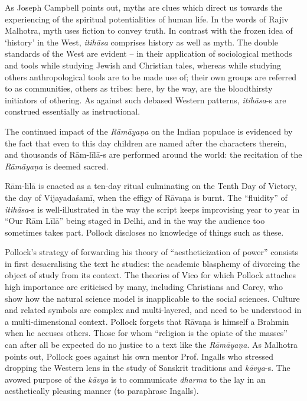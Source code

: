 As Joseph Campbell points out, myths are clues which direct us towards the experiencing of the spiritual potentialities of human life. In the words of Rajiv Malhotra, myth uses fiction to convey truth. In contrast with the frozen idea of ‘history’ in the West, \textit{itihāsa} comprises history as well as myth. The double standards of the West are evident – in their application of sociological methods and tools while studying Jewish and Christian tales, whereas while studying others anthropological tools are to be made use of; their own groups are referred to as communities, others as tribes: here, by the way, are the bloodthirsty initiators of othering. As against such debased Western patterns, \textit{itihāsa}-s are construed essentially as instructional.

The continued impact of the \textit{Rāmāyaṇa} on the Indian populace is evidenced by the fact that even to this day children are named after the characters therein, and thousands of Rām-līlā-s are performed around the world: the recitation of the \textit{Rāmāyaṇa} is deemed sacred.

Rām-līlā is enacted as a ten-day ritual culminating on the Tenth Day of Victory, the day of Vijayadaśamī, when the effigy of Rāvaṇa is burnt. The “fluidity” of \textit{itihāsa}-s is well-illustrated in the way the script keeps improvising year to year in “Our Rām Līlā” being staged in Delhi, and in the way the audience too sometimes takes part. Pollock discloses no knowledge of things such as these.

Pollock’s strategy of forwarding his theory of “aestheticization of power” consists in first desacralising the text he studies: the academic blasphemy of divorcing the object of study from its context. The theories of Vico for which Pollock attaches high importance are criticised by many, including Christians and Carey, who show how the natural science model is inapplicable to the social sciences. Culture and related symbols are complex and multi-layered, and need to be understood in a multi-dimensional context. Pollock forgets that Rāvaṇa is himself a Brahmin when he accuses others. Those for whom “religion is the opiate of the masses” can after all be expected do no justice to a text like the \textit{Rāmāyaṇa}. As Malhotra points out, Pollock goes against his own mentor Prof. Ingalls who stressed dropping the Western lens in the study of Sanskrit traditions and \textit{kāvya}-s. The avowed purpose of the \textit{kāvya} is to communicate \textit{dharma} to the lay in an aesthetically pleasing manner (to paraphrase Ingalls).

